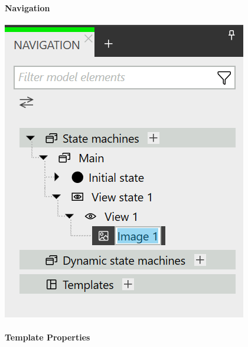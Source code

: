 \paragraph{Navigation}

\begin{center}
  \includegraphics[scale=0.8]{figures/Navigation_Adaption.png}
  \label{fig:Navigation_Adaption}
\end{center}


\paragraph{Template Properties}

